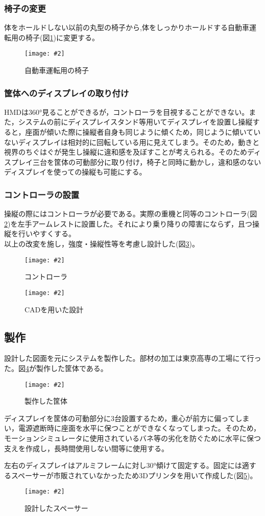 \documentclass[a4paper,12pt]{jsarticle}
\newcommand{\figuref}[1]{図\ref{#1}}
\newcommand{\fig}[4][width=\textwidth]{
    \begin{figure}[!h]
    \begin{center}
    \texttt{[image: \#2]}
    \caption{#3}
    \label{#4}
    \vspace*{-1cm}
    \end{center}
    \end{figure}
}
\begin{document}
\subsubsection{椅子の変更}
体をホールドしない以前の丸型の椅子から,体をしっかりホールドする自動車運転用の椅子(\figuref{recaro})に変更する。
\fig[width=9cm]{image/recaro.png}{自動車運転用の椅子}{recaro}

\subsubsection{筐体へのディスプレイの取り付け}
HMDは360°見ることができるが，コントローラを目視することができない。また，システムの前にディスプレイスタンド等用いてディスプレイを設置し操縦すると，座面が傾いた際に操縦者自身も同じように傾くため，同じように傾いていないディスプレイは相対的に回転している用に見えてしまう。そのため，動きと視界のちぐはぐが発生し操縦に違和感を及ぼすことが考えられる。そのためディスプレイ三台を筐体の可動部分に取り付け，椅子と同時に動かし，違和感のないディスプレイを使っての操縦も可能にする。

\subsubsection{コントローラの設置}
操縦の際にはコントローラが必要である。実際の重機と同等のコントローラ(\figuref{controller})を左手アームレストに設置した。それにより乗り降りの障害にならず，且つ操縦を行いやすくする。
\\

以上の改変を施し，強度・操縦性等を考慮し設計した(\figuref{cad})。

\fig[width=2cm]{image/controller.jpg}{コントローラ}{controller}
\fig[width=9cm]{image/cad.png}{CADを用いた設計}{cad}
\clearpage

\subsection{製作}
設計した図面を元にシステムを製作した。部材の加工は東京高専の工場にて行った。\figuref{body}が製作した筐体である。
\fig[width=9cm]{image/body.jpg}{製作した筐体}{body}

ディスプレイを筐体の可動部分に3台設置するため，重心が前方に偏ってしまい，電源遮断時に座面を水平に保つことができなくなってしまった。そのため，モーションシミュレータに使用されているバネ等の劣化を防ぐために水平に保つ支えを作成し，長時間使用しない間等に使用する。

左右のディスプレイはアルミフレームに対し30°傾けて固定する。固定には適するスペーサーが市販されていなかったため3Dプリンタを用いて作成した(\figuref{spacer})。
\fig[width=5cm]{image/spacer.png}{設計したスペーサー}{spacer}
\end{document}
